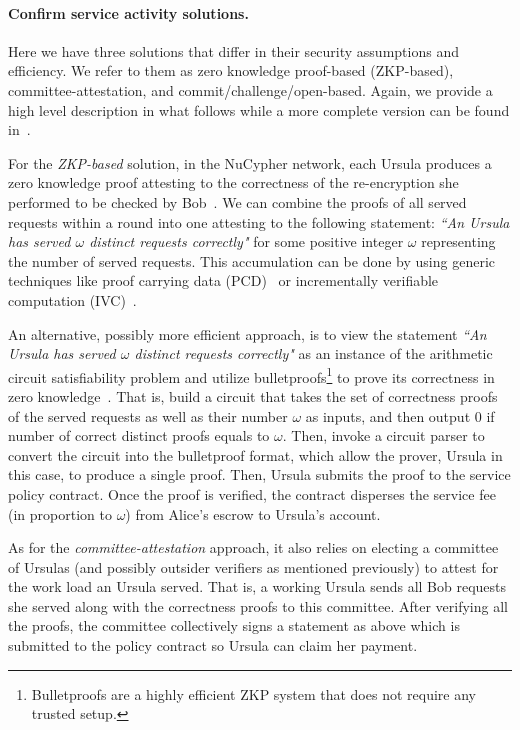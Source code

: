 \documentclass{llncs}
\begin{document}
\paragraph{Confirm service activity solutions.} Here we have three solutions that differ in their security assumptions and efficiency. We refer to them as zero knowledge proof-based (ZKP-based), committee-attestation, and commit/challenge/open-based. Again, we provide a high level description in what follows while a more complete version can be found in~\cite{confirm-activity-draft}. 


For the \emph{ZKP-based} solution, in the NuCypher network, each Ursula produces a zero knowledge proof attesting to the correctness of the re-encryption she performed to be checked by Bob~\cite{umbral2018}. We can combine the proofs of all served requests within a round into one attesting to the following statement: \emph{``An Ursula has served $\omega$ distinct requests correctly"} for some positive integer $\omega$ representing the number of served requests. This accumulation can be done by using generic techniques like proof carrying data (PCD)~\cite{chiesa2010proof} or incrementally verifiable computation (IVC)~\cite{valiant08}.


An alternative, possibly more efficient approach, is to view the statement \emph{``An Ursula has served $\omega$ distinct requests correctly"} as an instance of the arithmetic circuit satisfiability problem and utilize bulletproofs\footnote{Bulletproofs are a highly efficient ZKP system that does not require any trusted setup.} to prove its correctness in zero knowledge~\cite{bunz18}. That is, build a circuit that takes the set of correctness proofs of the served requests as well as their number $\omega$ as inputs, and then output 0 if number of correct distinct proofs equals to $\omega$. Then, invoke a circuit parser to convert the circuit into the bulletproof format, which allow the prover, Ursula in this case, to produce a single proof. Then, Ursula submits the proof to the service policy contract. Once the proof is verified, the contract disperses the service fee (in proportion to $\omega$) from Alice's escrow to Ursula's account.


As for the \emph{committee-attestation} approach, it also relies on electing a committee of Ursulas (and possibly outsider verifiers as mentioned previously) to attest for the work load an Ursula served. That is, a working Ursula sends all Bob requests she served along with the correctness proofs to this committee. After verifying all the proofs, the committee collectively signs a statement as above which is submitted to the policy contract so Ursula can claim her payment.
\end{document}
